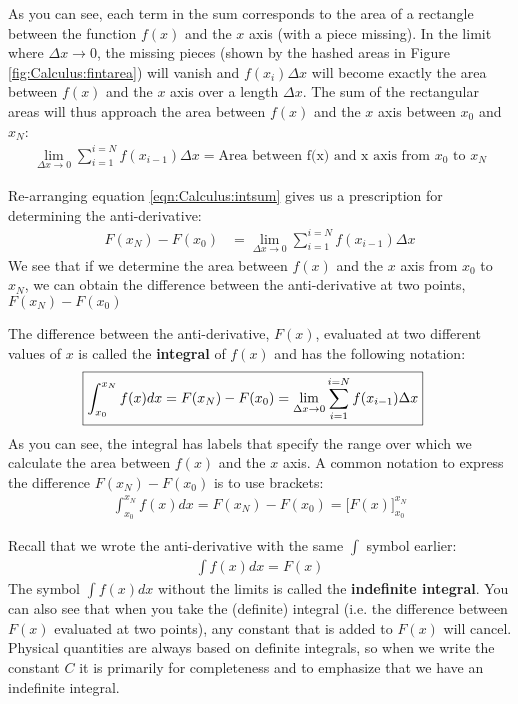 As you can see, each term in the sum corresponds to the area of a rectangle between the function $f(x)$ and the $x$ axis (with a piece missing). In the limit where $\Delta x\to 0$, the missing pieces (shown by the hashed areas in Figure \ref{fig:Calculus:fintarea}) will vanish and $f(x_i)\Delta x$ will become exactly the area between $f(x)$ and the $x$ axis over a length $\Delta x$. The sum of the rectangular areas will thus approach the area between $f(x)$ and the  $x$ axis between $x_0$ and $x_N$:
\begin{align*}
\lim_{\Delta x\to 0}\sum_{i=1}^{i=N} f(x_{i-1}) \Delta x=\text{Area between f(x) and x axis from $x_0$ to $x_N$}
\end{align*}

Re-arranging equation \ref{eqn:Calculus:intsum} gives us a prescription for determining the anti-derivative:
\begin{align*}
F(x_N) - F(x_0)&=\lim_{\Delta x\to 0}\sum_{i=1}^{i=N} f(x_{i-1}) \Delta x
\end{align*}
We see that if we determine the area between $f(x)$ and the $x$ axis from $x_0$ to $x_N$, we can obtain the difference between the anti-derivative at two points, $F(x_N)-F(x_0)$


The difference between the anti-derivative, $F(x)$, evaluated at two different values of $x$ is called the \textbf{integral} of $f(x)$ and has the following notation:
\begin{align}
\label{eqn:Calculus:intdef}
\Aboxed{\int_{x_0}^{x_N}f(x) dx=F(x_N) - F(x_0)=\lim_{\Delta x\to 0}\sum_{i=1}^{i=N} f(x_{i-1}) \Delta x}
\end{align}
As you can see, the integral has labels that specify the range over which we calculate the area between $f(x)$ and the $x$ axis. A common notation to express the difference $F(x_N) - F(x_0)$ is to use brackets:
\begin{align*}
\int_{x_0}^{x_N}f(x) dx=F(x_N) - F(x_0) =\big [ F(x) \big]_{x_0}^{x_N}
\end{align*}


Recall that we wrote the anti-derivative with the same $\int$ symbol earlier:
\begin{align*}
\int f(x) dx = F(x)
\end{align*}
The symbol $\int f(x) dx$ without the limits is called the \textbf{indefinite integral}. You can also see that when you take the (definite) integral (i.e. the  difference between $F(x)$ evaluated at two points), any constant that is added to $F(x)$ will cancel. Physical quantities are always based on definite integrals, so when we write the constant $C$ it is primarily for completeness and to emphasize that we have an indefinite integral.

